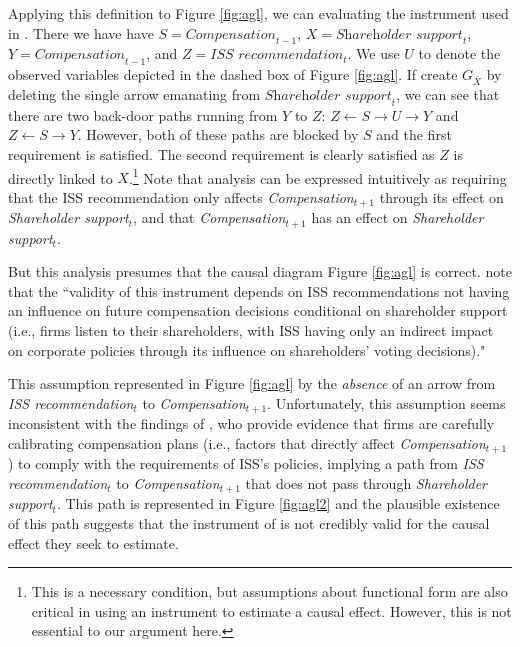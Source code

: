 \documentclass[11pt,reqno,titlepage]{amsart}
\begin{document}
Applying this definition to Figure \ref{fig:agl}, we can evaluating the instrument used in \citet{Armstrong:2013io}.
There we have have $S = \textit{Compensation}_{t-1}$,
$X =\textit{Shareholder support}_{t}$, $Y = \textit{Compensation}_{t-1}$, and $Z = \textit{ISS recommendation}_{t}$.
We use $U$ to denote the observed variables depicted in the dashed box of Figure \ref{fig:agl}.
If create $G_{\overline{X}}$ by deleting the single arrow emanating from $\textit{Shareholder support}_{t}$, we can see that there are two back-door paths running from $Y$ to $Z$: 
$Z \leftarrow S \rightarrow U \rightarrow Y$ and $Z \leftarrow S \rightarrow Y$.
However, both of these paths are blocked by $S$ and the first requirement is satisfied.
The second requirement is clearly satisfied as $Z$ is directly linked to $X$.\footnote{
This is a necessary condition, but assumptions about functional form are also critical in using an instrument to estimate a causal effect.
However, this is not essential to our argument here.}
%
Note that analysis can be expressed intuitively as requiring that the ISS recommendation only affects \textit{Compensation}$_{t+1}$ through its effect on \textit{Shareholder support}$_{t}$, and that \textit{Compensation}$_{t+1}$ has an effect on \textit{Shareholder support}$_{t}$.

But this analysis presumes that the causal diagram Figure \ref{fig:agl} is correct.
\citet[p.\,912]{Armstrong:2013io} note that the ``validity of this instrument depends on ISS recommendations not having an influence on future compensation decisions conditional on shareholder support (i.e., firms listen to their shareholders, with ISS having only an indirect impact on corporate policies through its influence on shareholders' voting decisions)."

This assumption represented in Figure \ref{fig:agl} by the \emph{absence} of an arrow from \textit{ISS recommendation}$_t$ to \textit{Compensation}$_{t+1}$.
Unfortunately, this assumption seems inconsistent with the findings of \citet{Gow:2013aa}, who provide evidence that firms are carefully calibrating compensation plans (i.e., factors that directly affect \textit{Compensation}$_{t+1}$) to comply with the requirements of ISS's policies, implying a path from \textit{ISS recommendation}$_t$ to \textit{Compensation}$_{t+1}$ that does not pass through \textit{Shareholder support}$_{t}$.
This path is represented in Figure \ref{fig:agl2} and the plausible existence of this path suggests that the instrument of \citet[p.\,912]{Armstrong:2013io} is not credibly valid for the causal effect they seek to estimate.
\end{document}
